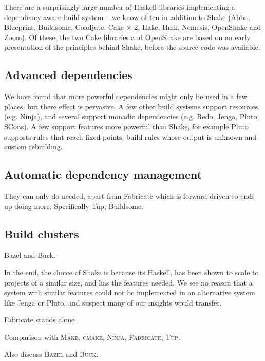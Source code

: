 There are a surprisingly large number of Haskell libraries implementing a dependency aware build system -- we know of ten in addition to Shake (Abba, Blueprint, Buildsome, Coadjute, Cake $\times$ 2, Hake, Hmk, Nemesis, OpenShake and Zoom). Of these, the two Cake libraries and OpenShake are based on an early presentation of the principles behind Shake, before the source code was available.

\subsection{Advanced dependencies}

We have found that more powerful dependencies might only be used in a few places, but there effect is pervasive. A few other build systems support resources (e.g. Ninja), and several support monadic dependencies (e.g. Redo, Jenga, Pluto, SCons). A few support features more powerful than Shake, for example Pluto supports rules that reach fixed-points, build rules whose output is unknown and custom rebuilding.

\subsection{Automatic dependency management}

They can only do needed, apart from Fabricate which is forward driven so ends up doing more. Specifically Tup, Buildsome.

\subsection{Build clusters} Bazel and Buck.



In the end, the choice of Shake is because its Haskell, has been shown to scale to projects of a similar size, and has the features needed. We see no reason that a system with similar features could not be implemented in an alternative system like Jenga or Pluto, and suspect many of our insights would transfer.


Fabricate stands alone



Comparison with \textsc{Make}, \textsc{cmake}, \textsc{Ninja},
\textsc{Fabricate}, \textsc{Tup}.

Also discuss \textsc{Bazel} and \textsc{Buck}.

